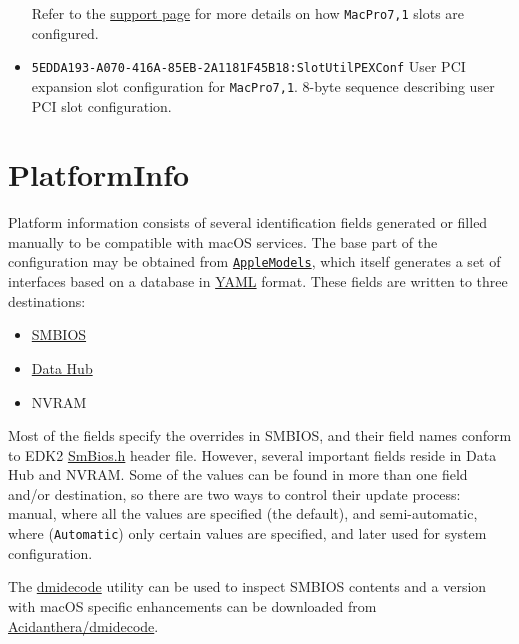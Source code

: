 \documentclass[]{article}
\providecommand{\tightlist}{%
  \setlength{\itemsep}{0pt}\setlength{\parskip}{0pt}}
\begin{document}
\begin{itemize}
  Refer to the \href{https://support.apple.com/HT210104}{support page}
  for more details on how \texttt{MacPro7,1} slots are configured.

\item
  \texttt{5EDDA193-A070-416A-85EB-2A1181F45B18:SlotUtilPEXConf}
  \break
  User PCI expansion slot configuration for \texttt{MacPro7,1}.
  8-byte sequence describing user PCI slot configuration.

\end{itemize}

\section{PlatformInfo}\label{platforminfo}

Platform information consists of several identification fields
generated or filled manually to be compatible with macOS services. The
base part of the configuration may be obtained from
\href{https://github.com/acidanthera/OpenCorePkg/blob/master/AppleModels}{\texttt{AppleModels}},
which itself generates a set of interfaces based on a database
in \href{https://yaml.org/spec/1.2/spec.html}{YAML} format. These fields
are written to three destinations:

\begin{itemize}
\tightlist
\item
  \href{https://www.dmtf.org/standards/smbios}{SMBIOS}
\item
  \href{https://github.com/acidanthera/OpenCorePkg/blob/master/Include/Intel/Protocol/DataHub.h}{Data
  Hub}
\item
  NVRAM
\end{itemize}

Most of the fields specify the overrides in SMBIOS, and their field
names conform to EDK2
\href{https://github.com/acidanthera/audk/blob/master/MdePkg/Include/IndustryStandard/SmBios.h}{SmBios.h}
header file. However, several important fields reside in Data Hub and
NVRAM. Some of the values can be found in more than one field and/or
destination, so there are two ways to control their update process:
manual, where all the values are specified (the default), and semi-automatic,
where (\texttt{Automatic}) only certain values are specified, and later used
for system configuration.

The \href{http://www.nongnu.org/dmidecode}{dmidecode} utility can be used to inspect
SMBIOS contents and a version with macOS specific enhancements can be downloaded
from \href{https://github.com/acidanthera/dmidecode/releases}{Acidanthera/dmidecode}.
\end{document}
